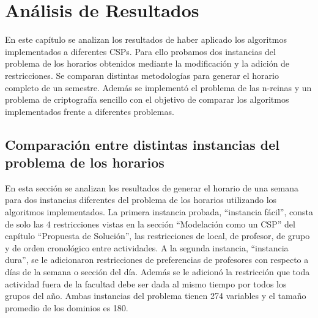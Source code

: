 \chapter{An\'alisis de Resultados}

En este cap\'itulo se analizan los resultados de haber aplicado los algoritmos implementados a diferentes CSPs. Para ello probamos dos instancias del problema de los horarios obtenidos mediante la modificaci\'on y la adici\'on de restricciones. Se comparan distintas metodolog\'ias para generar el horario completo de un semestre. Adem\'as se implement\'o el problema de las n-reinas y un problema de criptograf\'ia sencillo con el objetivo de comparar los algoritmos implementados frente a diferentes problemas.

\section{Comparaci\'on entre distintas instancias del problema de los horarios}

En esta secci\'on se analizan los resultados de generar el horario de una semana para dos instancias diferentes del problema de los horarios utilizando los algoritmos implementados. La primera instancia probada, ``instancia f\'acil'', consta de solo las 4 restricciones vistas en la secci\'on ``Modelaci\'on como un CSP'' del cap\'itulo ``Propuesta de Solución'', las restricciones de local, de profesor, de grupo y de orden cronol\'ogico entre actividades. A la segunda instancia, ``instancia dura'', se le adicionaron restricciones de preferencias de profesores con respecto a d\'ias de la semana o secci\'on del d\'ia. Adem\'as se le adicion\'o la restricci\'on que toda actividad fuera de la facultad debe ser dada al mismo tiempo por todos los grupos del año. Ambas instancias del problema tienen 274 variables y el tamaño promedio de los dominios es 180.

